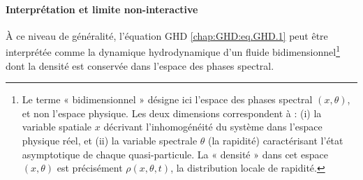 
\paragraph{Interprétation et limite non-interactive}  
À ce niveau de généralité, l'équation \gls{GHD} \eqref{chap:GHD:eq.GHD.1} peut être interprétée comme la dynamique hydrodynamique d'un fluide bidimensionnel\footnote{Le terme « bidimensionnel » désigne ici l'espace des phases spectral $(x,\theta)$, et non l'espace physique. Les deux dimensions correspondent à : (i) la variable spatiale $x$ décrivant l'inhomogénéité du système dans l'espace physique réel, et (ii) la variable spectrale $\theta$ (la rapidité) caractérisant l'état asymptotique de chaque quasi-particule. La « densité » dans cet espace $(x,\theta)$ est précisément $\rho(x,\theta,t)$, la distribution locale de rapidité.} dont la densité est conservée dans l'espace des phases spectral.  
